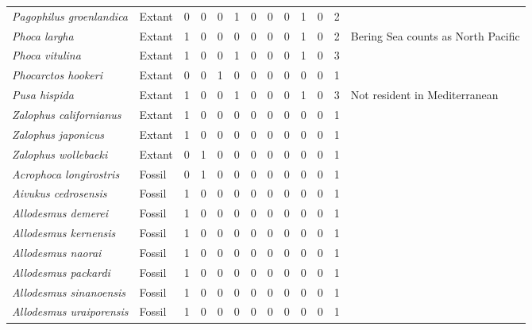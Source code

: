 \begin{longtable}{llccccccccccp{}}
\textit{Pagophilus groenlandica} &
Extant &
0 &
0 &
0 &
1 &
0 &
0 &
0 &
1 &
0 &
2 &
\\

\textit{Phoca largha} &
Extant &
1 &
0 &
0 &
0 &
0 &
0 &
0 &
1 &
0 &
2 &
Bering Sea counts as North Pacific\\

\textit{Phoca vitulina} &
Extant &
1 &
0 &
0 &
1 &
0 &
0 &
0 &
1 &
0 &
3 &
\\

\textit{Phocarctos hookeri} &
Extant &
0 &
0 &
1 &
0 &
0 &
0 &
0 &
0 &
0 &
1 &
\\

\textit{Pusa hispida} &
Extant &
1 &
0 &
0 &
1 &
0 &
0 &
0 &
1 &
0 &
3 &
Not resident in Mediterranean\\

\textit{Zalophus californianus} &
Extant &
1 &
0 &
0 &
0 &
0 &
0 &
0 &
0 &
0 &
1 &
\\

\textit{Zalophus japonicus} &
Extant &
1 &
0 &
0 &
0 &
0 &
0 &
0 &
0 &
0 &
1 &
\\

\textit{Zalophus wollebaeki} &
Extant &
0 &
1 &
0 &
0 &
0 &
0 &
0 &
0 &
0 &
1 &
\\

\textit{Acrophoca longirostris} &
Fossil &
0 &
1 &
0 &
0 &
0 &
0 &
0 &
0 &
0 &
1 &
\\

\textit{Aivukus cedrosensis} &
Fossil &
1 &
0 &
0 &
0 &
0 &
0 &
0 &
0 &
0 &
1 &
\\

\textit{Allodesmus demerei} &
Fossil &
1 &
0 &
0 &
0 &
0 &
0 &
0 &
0 &
0 &
1 &
\\

\textit{Allodesmus kernensis} &
Fossil &
1 &
0 &
0 &
0 &
0 &
0 &
0 &
0 &
0 &
1 &
\\

\textit{Allodesmus naorai} &
Fossil &
1 &
0 &
0 &
0 &
0 &
0 &
0 &
0 &
0 &
1 &
\\

\textit{Allodesmus packardi} &
Fossil &
1 &
0 &
0 & 
0 &
0 &
0 &
0 &
0 &
0 &
1 &
\\

\textit{Allodesmus sinanoensis} &
Fossil &
1 &
0 &
0 &
0 &
0 &
0 &
0 &
0 &
0 &
1 &
\\

\textit{Allodesmus uraiporensis} &
Fossil &
1 &
0 &
0 &
0 &
0 &
0 &
0 &
0 &
0 &
1 &
\\


\end{longtable}
